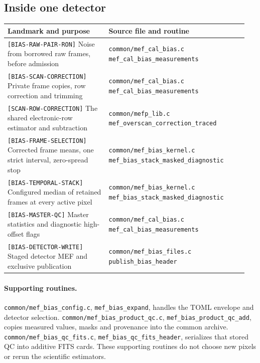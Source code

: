 \documentclass[11pt,a4paper]{article}
\newcommand{\code}[1]{\nolinkurl{#1}}
\begin{document}
\subsection*{Inside one detector}
\small
\begin{longtable}{@{}p{0.40\linewidth}p{0.55\linewidth}@{}}
\toprule
Landmark and purpose & Source file and routine \\
\midrule
\endhead
\code{[BIAS-RAW-PAIR-RON]}\newline
Noise from borrowed raw frames, before admission &
\code{common/mef_cal_bias.c}\newline
\code{mef_cal_bias_measurements} \\[4pt]
\code{[BIAS-SCAN-CORRECTION]}\newline
Private frame copies, row correction and trimming &
\code{common/mef_cal_bias.c}\newline
\code{mef_cal_bias_measurements} \\[4pt]
\code{[SCAN-ROW-CORRECTION]}\newline
The shared electronic-row estimator and subtraction &
\code{common/mefp_lib.c}\newline
\code{mef_overscan_correction_traced} \\[4pt]
\code{[BIAS-FRAME-SELECTION]}\newline
Corrected frame means, one strict interval, zero-spread stop &
\code{common/mef_bias_kernel.c}\newline
\code{mef_bias_stack_masked_diagnostic} \\[4pt]
\code{[BIAS-TEMPORAL-STACK]}\newline
Configured median of retained frames at every active pixel &
\code{common/mef_bias_kernel.c}\newline
\code{mef_bias_stack_masked_diagnostic} \\[4pt]
\code{[BIAS-MASTER-QC]}\newline
Master statistics and diagnostic high-offset flags &
\code{common/mef_cal_bias.c}\newline
\code{mef_cal_bias_measurements} \\[4pt]
\code{[BIAS-DETECTOR-WRITE]}\newline
Staged detector MEF and exclusive publication &
\code{common/mef_bias_files.c}\newline
\code{publish_bias_header} \\
\bottomrule
\end{longtable}
\normalsize

\paragraph{Supporting routines.}
\code{common/mef_bias_config.c}, \code{mef_bias_expand},
handles the TOML envelope and detector selection.
\code{common/mef_bias_product_qc.c}, \code{mef_bias_product_qc_add},
copies measured values, masks and provenance into the common archive.
\code{common/mef_bias_qc_fits.c}, \code{mef_bias_qc_fits_header},
serializes that stored QC into additive FITS cards. These supporting routines
do not choose new pixels or rerun the scientific estimators.
\end{document}
